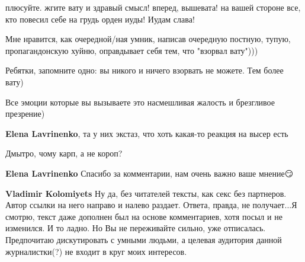 \begin{itemize}
\begin{itemize}
плюсуйте. жгите вату и здравый смысл! вперед, вышевата! на вашей стороне все, кто повесил себе на грудь орден иуды! Иудам слава!

 

Мне нравится, как очередной/ная умник, написав очередную постную, тупую,
пропагандонскую хуйню, оправдывает себя тем, что "взорвал вату")))

Ребятки, запомните одно: вы никого и ничего взорвать не можете. Тем более вату)

Все эмоции которые вы вызываете это насмешливая жалость и брезгливое презрение)


 
\textbf{Elena Lavrinenko}, та у них экстаз, что хоть какая-то реакция на высер есть

 
Дмытро, чому карп, а не короп?

 
\textbf{Elena Lavrinenko} Спасибо за комментарии, нам очень важно ваше мнение😏

 
\textbf{Vladimir Kolomiyets} Ну да, без читателей тексты, как секс без партнеров. Автор ссылки на него направо и налево раздает. Ответа, правда, не получает...Я смотрю, текст даже дополнен был на основе комментариев, хотя посыл и не изменился. И то ладно. Но Вы не переживайте сильно, уже отписалась. Предпочитаю дискутировать с умными людьми, а целевая аудитория данной журналистки(?) не входит в круг моих интересов.


\end{itemize}
\end{itemize}
